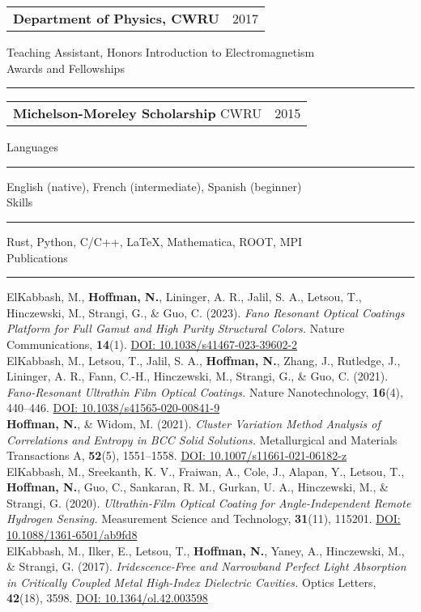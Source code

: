 \documentclass[letterpaper,11pt,oneside]{article}
\makeatletter
\newcommand{\datedentry}[2]{%
  \begin{tabular*}{\textwidth}{@{\extracolsep{\fill}} p{0.80\textwidth} r}
    #1 & #2 \\
  \end{tabular*}
}
\newcommand{\sectionheader}[1]{%
{\Large{#1}}
\vspace{2ex}
\hrule
\vspace{2ex}
}
\makeatother
\begin{document}
\datedentry{\textbf{Department of Physics, CWRU}}{2017\textendash 2019}
Teaching Assistant, Honors Introduction to Electromagnetism\\

\sectionheader{Awards and Fellowships}
\datedentry{\textbf{Michelson-Moreley Scholarship}
CWRU}{2015\textendash 2019}

\newpage

\sectionheader{Languages}
English (native), French (intermediate), Spanish (beginner)\\

\sectionheader{Skills}
Rust, Python, C/C++, \LaTeX, Mathematica, ROOT, MPI\\

\sectionheader{Publications}
ElKabbash, M., \textbf{Hoffman, N.}, Lininger, A. R., Jalil, S. A., Letsou, T., Hinczewski, M., Strangi, G., \& Guo, C. (2023). \textit{Fano Resonant Optical Coatings Platform for Full Gamut and High Purity Structural Colors.} Nature Communications, \textbf{14}(1). \href{https://doi.org/10.1038/s41467-023-39602-2}{DOI: 10.1038/s41467-023-39602-2}\\

ElKabbash, M., Letsou, T., Jalil, S. A., \textbf{Hoffman, N.}, Zhang, J., Rutledge, J., Lininger, A. R., Fann, C.-H., Hinczewski, M., Strangi, G., \& Guo, C. (2021). \textit{Fano-Resonant Ultrathin Film Optical Coatings.} Nature Nanotechnology, \textbf{16}(4), 440–446. \href{https://doi.org/10.1038/s41565-020-00841-9}{DOI: 10.1038/s41565-020-00841-9}\\

\textbf{Hoffman, N.}, \& Widom, M. (2021). \textit{Cluster Variation Method Analysis of Correlations and Entropy in BCC Solid Solutions.} Metallurgical and Materials Transactions A, \textbf{52}(5), 1551–1558. \href{https://doi.org/10.1007/s11661-021-06182-z}{DOI: 10.1007/s11661-021-06182-z}\\

ElKabbash, M., Sreekanth, K. V., Fraiwan, A., Cole, J., Alapan, Y., Letsou, T., \textbf{Hoffman, N.}, Guo, C., Sankaran, R. M., Gurkan, U. A., Hinczewski, M., \& Strangi, G. (2020). \textit{Ultrathin-Film Optical Coating for Angle-Independent Remote Hydrogen Sensing.} Measurement Science and Technology, \textbf{31}(11), 115201. \href{https://doi.org/10.1088/1361-6501/ab9fd8}{DOI: 10.1088/1361-6501/ab9fd8}\\

ElKabbash, M., Ilker, E., Letsou, T., \textbf{Hoffman, N.}, Yaney, A., Hinczewski, M., \& Strangi, G. (2017). \textit{Iridescence-Free and Narrowband Perfect Light Absorption in Critically Coupled Metal High-Index Dielectric Cavities.} Optics Letters, \textbf{42}(18), 3598. \href{https://doi.org/10.1364/ol.42.003598}{DOI: 10.1364/ol.42.003598}\\
\end{document}
